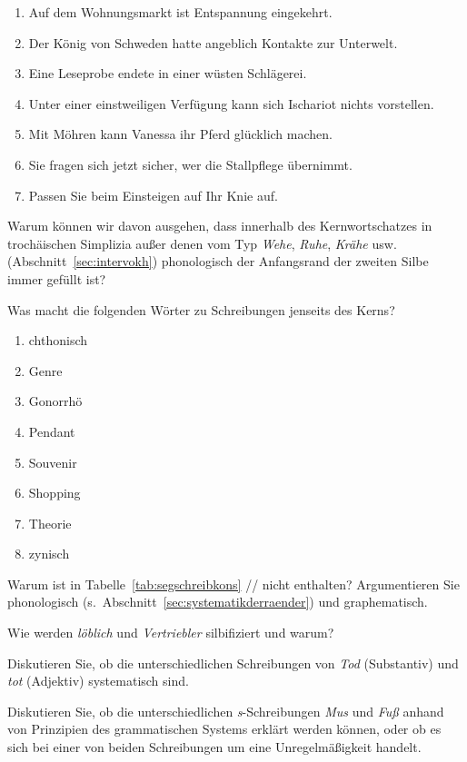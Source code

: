 \begin{enumerate}\Lf
  \item Auf dem Wohnungsmarkt ist Entspannung eingekehrt.
  \item Der König von Schweden hatte angeblich Kontakte zur Unterwelt.
  \item Eine Leseprobe endete in einer wüsten Schlägerei.
  \item Unter einer einstweiligen Verfügung kann sich Ischariot nichts vorstellen.
  \item Mit Möhren kann Vanessa ihr Pferd glücklich machen.
  \item Sie fragen sich jetzt sicher, wer die Stallpflege übernimmt.
  \item Passen Sie beim Einsteigen auf Ihr Knie auf. 
\end{enumerate}

\Uebung[\tristar] \label{u145} Warum können wir davon ausgehen, dass innerhalb des Kernwortschatzes in trochäischen Simplizia außer denen vom Typ \textit{Wehe}, \textit{Ruhe}, \textit{Krähe} usw. (Abschnitt~\ref{sec:intervokh}) phonologisch der Anfangsrand der zweiten Silbe immer gefüllt ist?

\Uebung \label{u146} Was macht die folgenden Wörter zu Schreibungen jenseits des Kerns?

\begin{enumerate}\Lf
  \item chthonisch
  \item Genre
  \item Gonorrhö
  \item Pendant
  \item Souvenir
  \item Shopping
  \item Theorie
  \item zynisch
\end{enumerate}

\Uebung[\tristar] \label{u147} Warum ist in Tabelle~\ref{tab:segschreibkons} // nicht enthalten?
Argumentieren Sie phonologisch (s.\ Abschnitt~\ref{sec:systematikderraender}) und graphematisch.

\Uebung[\tristar] \label{u148} Wie werden \textit{löblich} und \textit{Vertriebler} silbifiziert und warum?

\Uebung[\tristar] \label{u149} Diskutieren Sie, ob die unterschiedlichen Schreibungen von \textit{Tod} (Substantiv) und \textit{tot} (Adjektiv) systematisch sind.

\Uebung[\tristar] \label{u1410} Diskutieren Sie, ob die unterschiedlichen \textit{s}-Schreibungen \textit{Mus} und \textit{Fuß} anhand von Prinzipien des grammatischen Systems erklärt werden können, oder ob es sich bei einer von beiden Schreibungen um eine Unregelmäßigkeit handelt.
